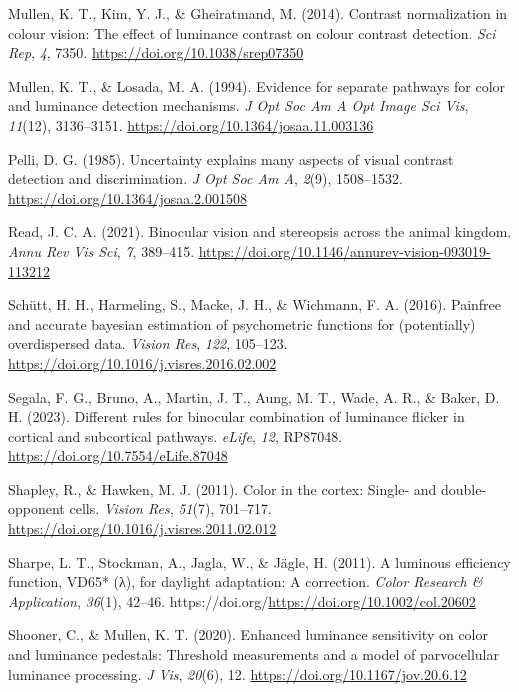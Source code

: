 \documentclass[
  letterpaper,
  DIV=11,
  numbers=noendperiod]{scrartcl}
\newlength{\cslhangindent}
\newenvironment{CSLReferences}[2] %
 {\begin{list}{}{%
  \setlength{\itemindent}{0pt}
  \setlength{\leftmargin}{0pt}
  \setlength{\parsep}{0pt}
  \ifodd #1
   \setlength{\leftmargin}{\cslhangindent}
   \setlength{\itemindent}{-1\cslhangindent}
  \fi
  \setlength{\itemsep}{#2\baselineskip}}}
 {\end{list}}
\begin{document}
\begin{CSLReferences}{1}{0}
Mullen, K. T., Kim, Y. J., \& Gheiratmand, M. (2014). Contrast
normalization in colour vision: The effect of luminance contrast on
colour contrast detection. \emph{Sci Rep}, \emph{4}, 7350.
\url{https://doi.org/10.1038/srep07350}

Mullen, K. T., \& Losada, M. A. (1994). Evidence for separate pathways
for color and luminance detection mechanisms. \emph{J Opt Soc Am A Opt
Image Sci Vis}, \emph{11}(12), 3136--3151.
\url{https://doi.org/10.1364/josaa.11.003136}

Pelli, D. G. (1985). Uncertainty explains many aspects of visual
contrast detection and discrimination. \emph{J Opt Soc Am A},
\emph{2}(9), 1508--1532. \url{https://doi.org/10.1364/josaa.2.001508}

Read, J. C. A. (2021). Binocular vision and stereopsis across the animal
kingdom. \emph{Annu Rev Vis Sci}, \emph{7}, 389--415.
\url{https://doi.org/10.1146/annurev-vision-093019-113212}

Schütt, H. H., Harmeling, S., Macke, J. H., \& Wichmann, F. A. (2016).
Painfree and accurate bayesian estimation of psychometric functions for
(potentially) overdispersed data. \emph{Vision Res}, \emph{122},
105--123. \url{https://doi.org/10.1016/j.visres.2016.02.002}

Segala, F. G., Bruno, A., Martin, J. T., Aung, M. T., Wade, A. R., \&
Baker, D. H. (2023). Different rules for binocular combination of
luminance flicker in cortical and subcortical pathways. \emph{eLife},
\emph{12}, RP87048. \url{https://doi.org/10.7554/eLife.87048}

Shapley, R., \& Hawken, M. J. (2011). Color in the cortex: Single- and
double-opponent cells. \emph{Vision Res}, \emph{51}(7), 701--717.
\url{https://doi.org/10.1016/j.visres.2011.02.012}

Sharpe, L. T., Stockman, A., Jagla, W., \& Jägle, H. (2011). A luminous
efficiency function, VD65* (λ), for daylight adaptation: A correction.
\emph{Color Research \& Application}, \emph{36}(1), 42--46.
https://doi.org/\url{https://doi.org/10.1002/col.20602}

Shooner, C., \& Mullen, K. T. (2020). Enhanced luminance sensitivity on
color and luminance pedestals: Threshold measurements and a model of
parvocellular luminance processing. \emph{J Vis}, \emph{20}(6), 12.
\url{https://doi.org/10.1167/jov.20.6.12}


\end{CSLReferences}
\end{document}
